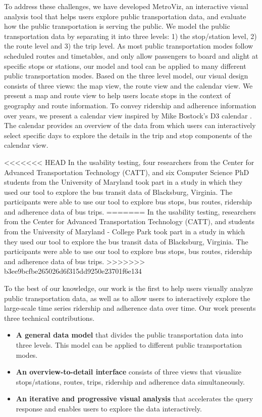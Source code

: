 \documentclass[journal]{vgtc}                %
\begin{document}
To address these challenges, we have developed MetroViz, an interactive visual analysis tool that helps users explore public transportation data, and evaluate how the public transportation is serving the public. 
We model the public transportation data by separating it into three levels: 1) the stop/station level, 2) the route level and 3) the trip level. As most public transportation modes follow scheduled routes and timetables, and only allow passengers to board and alight at specific stops or stations, our model and tool can be applied to many different public transportation modes.
Based on the three level model, our visual design consists of three views: the map view, the route view and the calendar view.
We present a map and route view to help users locate stops in the context of geography and route information. To convey ridership and adherence information over years, we present a calendar view inspired by Mike Bostock's D3 calendar \cite{d3calendar}. The calendar provides an overview of the data from which users can interactively select specific days to explore the details in the trip and stop components of the calendar view.

<<<<<<< HEAD
In the usability testing, four researchers from the Center for Advanced Transportation Technology (CATT), and six Computer Science PhD students from the University of Maryland took part in a study in which they used our tool to explore the bus transit data of Blacksburg, Virginia. The participants were able to use our tool to explore bus stops, bus routes, ridership and adherence data of bus trips.
=======
In the usability testing, researchers from the Center for Advanced Transportation Technology (CATT), and students from the University of Maryland - College Park took part in a study in which they used our tool to explore the bus transit data of Blacksburg, Virginia. The participants were able to use our tool to explore bus stops, bus routes, ridership and adherence data of bus trips.
>>>>>>> b3ee9bcfbe265026d6f315dd9250e23701f6e134

To the best of our knowledge, our work is the first to help users visually analyze public transportation data, as well as to allow users to interactively explore the large-scale time series ridership and adherence data over time. Our work presents three technical contributions.

\begin{itemize}
  \item \textbf{A general data model} that divides the public transportation data into three levels. This model can be applied to different public transportation modes.
  \item \textbf{An overview-to-detail interface} consists of three views that visualize stops/stations, routes, trips, ridership and adherence data simultaneously.
  \item \textbf{An iterative and progressive visual analysis} that accelerates the query response and enables users to explore the data interactively.
\end{itemize}
\end{document}
